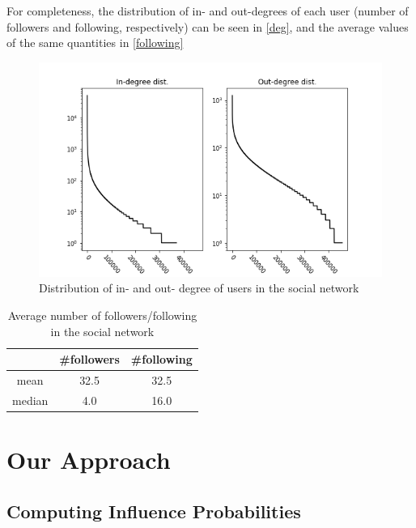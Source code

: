 \documentclass[sigconf]{acmart}
\begin{document}
For completeness, the distribution of in- and out-degrees of each user (number of followers and following, respectively) can be seen in \autoref{deg}, and the average values of the same quantities in \autoref{following}

\begin{figure}[htbp]
\begin{center}
\includegraphics[width=\linewidth]{Figures/deg.png}
\caption{Distribution of in- and out- degree of users in the social network}
\label{deg}
\end{center}
\end{figure}

\begin{table}[htp]
\caption{Average number of followers/following in the social network}
\begin{center}
\begin{tabular}{|c|c|c|}
\hline
 & \#followers & \#following \\
 \hline
mean &32.5 & 32.5 \\
median & 4.0 & 16.0 \\
\hline
\end{tabular}
\end{center}
\label{following}
\end{table}

\section{Our Approach}

\subsection{Computing Influence Probabilities}
\end{document}
